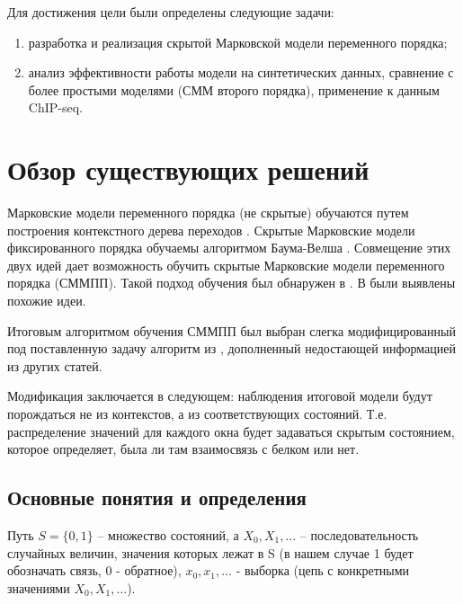 \documentclass{matmex-diploma-custom}
\begin{document}
Для достижения цели были определены следующие задачи:
\begin{enumerate}
\item
разработка и реализация скрытой Марковской модели
переменного порядка;
\item
анализ эффективности работы модели на синтетических
данных, сравнение с более простыми моделями (СММ
второго порядка), применение к данным ChIP-seq.
\end{enumerate}


\section{Обзор существующих решений}
Марковские модели переменного порядка (не скрытые) обучаются путем построения контекстного дерева переходов \cite{Buhlmann1999}. Скрытые Марковские модели фиксированного порядка обучаемы алгоритмом Баума-Велша \cite{Rabiner1989}.
Совмещение этих двух идей дает возможность обучить скрытые Марковские модели переменного порядка (СММПП). Такой подход обучения был обнаружен в \cite{Wang2006}. В \cite{Dumont2014} были выявлены похожие идеи.

Итоговым алгоритмом обучения СММПП был выбран слегка модифицированный под поставленную задачу алгоритм  из \cite{Wang2006}, дополненный недостающей информацией из других статей.

Модификация заключается в следующем: наблюдения итоговой модели будут порождаться не из контекстов, а из соответствующих состояний. Т.е. распределение значений для каждого окна будет задаваться скрытым состоянием, которое определяет, была ли там взаимосвязь с белком или нет. 

\subsection{Основные понятия и определения}
Путь $ S = \{0, 1\} $ -- множество состояний, а $X_0, X_1, \ldots $ -- последовательность случайных величин, значения которых лежат в S (в нашем случае 1 будет обозначать связь, 0 - обратное), $x_0, x_1, \ldots$ - выборка (цепь с конкретными значениями $X_0, X_1, \ldots $).
\end{document}
